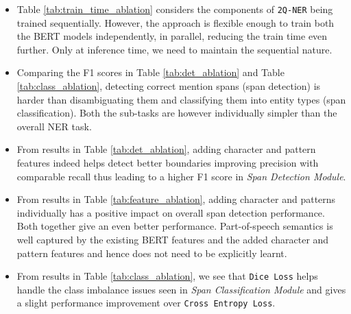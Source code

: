 \begin{itemize}
    \item Table \ref{tab:train_time_ablation} considers the components of \texttt{2Q-NER} being trained sequentially. However, the approach is flexible enough to train both the BERT models independently, in parallel, reducing the train time even further. Only at inference time, we need to maintain the sequential nature.
    
    \item Comparing the F1 scores in Table \ref{tab:det_ablation} and Table \ref{tab:class_ablation}, detecting correct mention spans (span detection) is harder than disambiguating them and classifying them into entity types (span classification). Both the sub-tasks are however individually simpler than the overall NER task.
    
    \item From results in Table \ref{tab:det_ablation}, adding character and pattern features indeed helps detect better boundaries improving precision with comparable recall thus leading to a higher F1 score in \textit{Span Detection Module}.
    
    \item From results in Table \ref{tab:feature_ablation}, adding character and patterns individually has a positive impact on overall span detection performance. Both together give an even better performance. Part-of-speech semantics is well captured by the existing BERT features and the added character and pattern features and hence does not need to be explicitly learnt.
    
    \item From results in Table \ref{tab:class_ablation}, we see that \texttt{Dice Loss} helps handle the class imbalance issues seen in \textit{Span Classification Module} and gives a slight performance improvement over \texttt{Cross Entropy Loss}.
\end{itemize}

